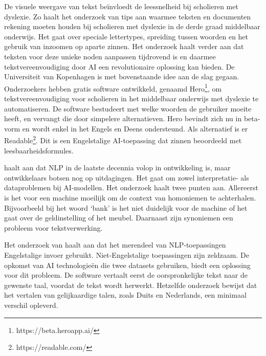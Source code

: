 
De visuele weergave van tekst beïnvloedt de leessnelheid bij scholieren met dyslexie. Zo haalt het onderzoek van \textcite{Rello2012} tips aan waarmee teksten en documenten rekening moeten houden bij scholieren met dyslexie in de derde graad middelbaar onderwijs. Het gaat over speciale lettertypes, spreiding tussen woorden en het gebruik van inzoomen op aparte zinnen. Het onderzoek haalt verder aan dat teksten voor deze unieke noden aanpassen tijdrovend is en daarmee tekstvereenvoudiging door AI een revolutionaire oplossing kan bieden. De Universiteit van Kopenhagen is met bovenstaande idee aan de slag gegaan. Onderzoekers \textcite{Bingel2018} hebben gratis software ontwikkeld, genaamd Hero\footnote{https://beta.heroapp.ai/}, om tekstvereenvoudiging voor scholieren in het middelbaar onderwijs met dyslexie te automatiseren. De software bestudeert met welke woorden de gebruiker moeite heeft, en vervangt die door simpelere alternatieven. Hero bevindt zich nu in beta-vorm en wordt enkel in het Engels en Deens ondersteund. Als alternatief is er Readable\footnote{https://readable.com/}. Dit is een Engelstalige AI-toepassing dat zinnen beoordeeld met leesbaarheidsformules.

\textcite{Roldos2020} haalt aan dat NLP in de laatste decennia volop in ontwikkeling is, maar ontwikkelaars botsen nog op uitdagingen. Het gaat om zowel interpretatie- als dataproblemen bij AI-modellen. Het onderzoek haalt twee punten aan. Allereerst is het voor een machine moeilijk om de context van homoniemen te achterhalen. Bijvoorbeeld bij het woord ‘bank’ is het niet duidelijk voor de machine of het gaat over de geldinstelling of het meubel. Daarnaast zijn synoniemen een probleem voor tekstverwerking.

Het onderzoek van \textcite{Sciforce2020} haalt aan dat het merendeel van NLP-toepassingen Engelstalige invoer gebruikt. Niet-Engelstalige toepassingen zijn zeldzaam. De opkomst van AI technologieën die twee datasets gebruiken, biedt een oplossing voor dit probleem. De software vertaalt eerst de oorspronkelijke tekst naar de gewenste taal, voordat de tekst wordt herwerkt. Hetzelfde onderzoek bewijst dat het vertalen van gelijkaardige talen, zoals Duits en Nederlands, een minimaal verschil opleverd.

